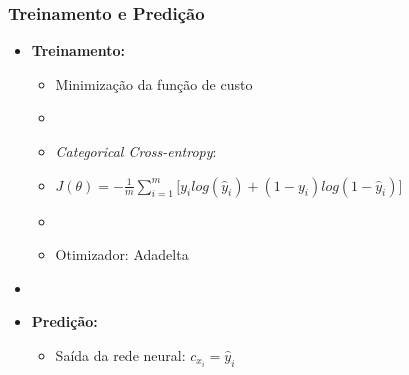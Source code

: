 \documentclass[10pt]{beamer}
\begin{document}
\begin{frame}[fragile]
\frametitle{Treinamento e Predição}
  
  \begin{itemize}
    \item \textbf{Treinamento:}

    \begin{itemize}
      \item[-] Minimização da função de custo

      \item[\ ] \ 

      \item[-] \textit{Categorical Cross-entropy}: 

      \item[\ ] $J(\theta) = - \frac{1}{m} \sum\limits_{i=1}^{m} \Big[ y_ilog(\hat{y}_i) + (1 - y_i)log(1 - \hat{y}_i) \Big]$

      \item[\ ] \ 

      \item[-] Otimizador: Adadelta
      
    \end{itemize}

    \item[\ ] \ 

    \item \textbf{Predição:}
    \begin{itemize}
      \item[-] Saída da rede neural: $c_{x_i} = \hat{y}_i$
    \end{itemize}

  \end{itemize}

\end{frame}
\end{document}
